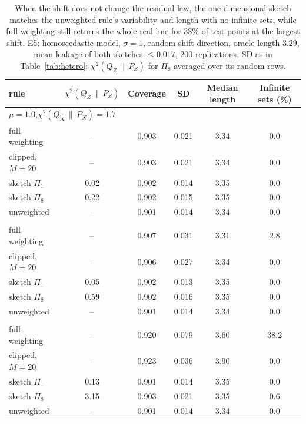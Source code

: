 \documentclass[11pt,a4paper]{article}
\newcommand{\PX}{P_X}
\newcommand{\QX}{Q_X}
\newcommand{\chisq}{\chi^2(\QX\,\|\,\PX)}
\newcommand{\chisqZ}{\chi^2(Q_Z\,\|\,P_Z)}
\theoremstyle{plain}
\theoremstyle{definition}
\theoremstyle{remark}
\begin{document}
\begin{table}[!htbp]\centering\footnotesize\setlength{\tabcolsep}{5pt}
\begin{tabular}{lccccc}
\toprule
rule & $\chisqZ$ & Coverage & SD & Median length & Infinite sets (\%)\\
\midrule
\multicolumn{6}{l}{$\mu=1.0$,\quad $\chisq=1.7$}\\
full weighting & -- & 0.903 & 0.021 & 3.34 & 0.0\\
clipped, $M=20$ & -- & 0.903 & 0.021 & 3.34 & 0.0\\
sketch $\Pi_1$ & 0.02 & 0.902 & 0.014 & 3.35 & 0.0\\
sketch $\Pi_8$ & 0.22 & 0.902 & 0.015 & 3.35 & 0.0\\
unweighted & -- & 0.901 & 0.014 & 3.34 & 0.0\\
\addlinespace
\multicolumn{6}{l}{$\mu=1.5$,\quad $\chisq=8.5$}\\
full weighting & -- & 0.907 & 0.031 & 3.31 & 2.8\\
clipped, $M=20$ & -- & 0.906 & 0.027 & 3.34 & 0.0\\
sketch $\Pi_1$ & 0.05 & 0.902 & 0.013 & 3.35 & 0.0\\
sketch $\Pi_8$ & 0.59 & 0.902 & 0.016 & 3.35 & 0.0\\
unweighted & -- & 0.901 & 0.014 & 3.34 & 0.0\\
\addlinespace
\multicolumn{6}{l}{$\mu=2.5$,\quad $\chisq=517$}\\
full weighting & -- & 0.920 & 0.079 & 3.60 & 38.2\\
clipped, $M=20$ & -- & 0.923 & 0.036 & 3.90 & 0.0\\
sketch $\Pi_1$ & 0.13 & 0.901 & 0.014 & 3.35 & 0.0\\
sketch $\Pi_8$ & 3.15 & 0.903 & 0.021 & 3.35 & 0.6\\
unweighted & -- & 0.901 & 0.014 & 3.34 & 0.0\\
\bottomrule
\end{tabular}
\caption{When the shift does not change the residual law, the one-dimensional sketch matches the unweighted rule's variability and length with no infinite sets, while full weighting still returns the whole real line for $38\%$ of test points at the largest shift. E5: homoscedastic model, $\sigma=1$, random shift direction, oracle length $3.29$, mean leakage of both sketches $\le0.017$, $200$ replications. SD as in Table~\ref{tab:hetero}; $\chisqZ$ for $\Pi_8$ averaged over its random rows.}\label{tab:homo}
\end{table}
\end{document}
